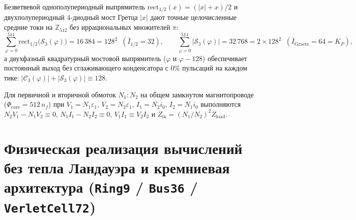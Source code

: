 \begin{theorem}
\label{thm:eng-rectifiers}
Безветвевой однополупериодный выпрямитель $\mathrm{rect}_{1/2}(x) = (|x|+x)/2$ и двухполупериодный 4-диодный мост Гретца $|x|$ дают точные целочисленные средние токи на $\mathbb{Z}_{512}$ без иррациональных множителей $\pi$:
\begin{equation}
  \label{eq:eng-rectifiers}
  \sum_{\varphi=0}^{511}\mathrm{rect}_{1/2}\bigl(\mathcal{S}_3(\varphi)\bigr) = 16\,384 = 128^2 \;\;(\bar{I}_{1/2} = 32), \qquad
  \sum_{\varphi=0}^{511}\bigl|\mathcal{S}_3(\varphi)\bigr| = 32\,768 = 2\times 128^2 \;\;(\bar{I}_{\mathrm{Graetz}} = 64 = K_P),
\end{equation}
а двухфазный квадратурный мостовой выпрямитель ($\varphi$ и $\varphi - 128$) обеспечивает постоянный выход без сглаживающего конденсатора с $0\%$ пульсаций на каждом тике: $|\mathcal{C}_3(\varphi)| + |\mathcal{S}_3(\varphi)| \equiv 128$.
\end{theorem}

\begin{theorem}
\label{thm:eng-transformer}
Для первичной и вторичной обмоток $N_1 : N_2$ на общем замкнутом магнитопроводе ($\Phi_{\mathrm{core}} = 512\,n_f$) при $V_1 = N_1\varepsilon_1$, $V_2 = N_2\varepsilon_1$, $I_1 = N_2 i_0$, $I_2 = N_1 i_0$ выполняются $N_2 V_1 - N_1 V_2 \equiv 0$, $N_1 I_1 - N_2 I_2 \equiv 0$, $V_1 I_1 \equiv V_2 I_2$ и $Z_{\mathrm{in}} = (N_1/N_2)^2 Z_{\mathrm{load}}$.
\end{theorem}

\chapter{Физическая реализация вычислений без тепла Ландауэра и кремниевая архитектура (\texttt{Ring9} / \texttt{Bus36} / \texttt{VerletCell72})}
\label{ch:eng-silicon-architecture}

